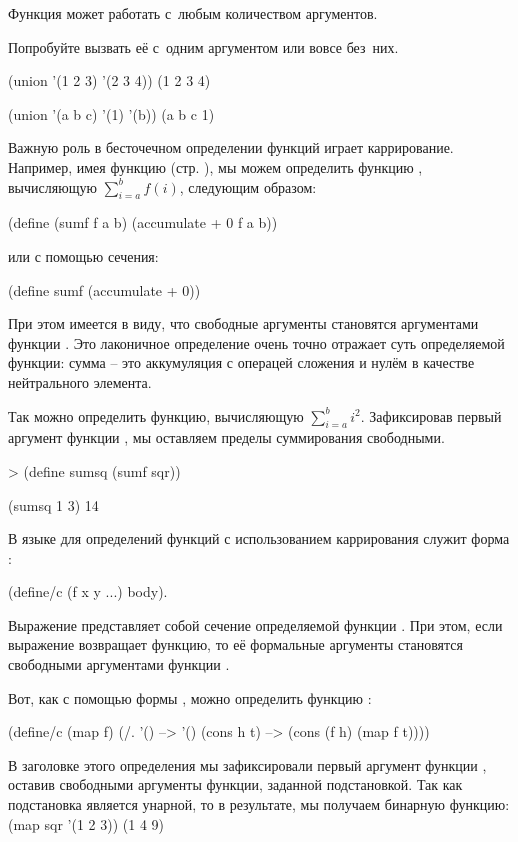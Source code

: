 \begin{example}{Функция  может работать с~любым количеством аргументов.

Попробуйте вызвать её с~одним аргументом или вовсе без~них.}
\REPL
  {(union '(1 2 3) '(2 3 4))}
  {(1 2 3 4)}

\REPL
  {(union '(a b c) '(1) '(b))}
  {(a b c 1)} 
\end{example}

Важную роль в бесточечном определении функций играет каррирование. Например, имея функцию  (стр. \pageref{accumulate}), мы можем определить функцию , вычисляющую $\sum_{i=a}^b f(i)$,  следующим образом:
\begin{SchemeCode}[emph={f,a,b}]
  (define (sumf f a b) (accumulate + 0 f a b))
\end{SchemeCode}
или с помощью сечения:
\begin{SchemeCode}
  (define sumf (accumulate + 0))
\end{SchemeCode}
При этом имеется в виду, что свободные аргументы  становятся аргументами функции . Это лаконичное определение очень точно отражает суть определяемой функции: сумма -- это аккумуляция с операцей сложения и нулём в качестве нейтрального элемента.

Так можно определить функцию, вычисляющую $\sum_{i=a}^b i^2$. Зафиксировав первый аргумент функции , мы оставляем пределы суммирования свободными.
\begin{SchemeCode}
   > (define sumsq (sumf sqr))
\end{SchemeCode}
\REPL
  {(sumsq 1 3)}
  {14} 

В языке \Scheme для определений функций с использованием каррирования служит форма :\label{define-c} 
\begin{SchemeCode}
(define/c (f x y ...) body).
\end{SchemeCode}
Выражение  представляет собой сечение определяемой функции . При этом, если выражение  возвращает функцию, то её формальные аргументы становятся свободными аргументами функции .

Вот, как с помощью формы , можно определить функцию :
\begin{SchemeCode}[emph={f,h,t}]
(define/c (map f)
  (/. '() --> '()
      (cons h t) --> (cons (f h) (map f t))))
\end{SchemeCode}
В заголовке этого определения мы зафиксировали первый аргумент функции , оставив свободными аргументы функции, заданной подстановкой. Так как подстановка является унарной, то в результате, мы получаем бинарную функцию:
\REPL
  {(map sqr '(1 2 3))}
  {(1 4 9)} 

